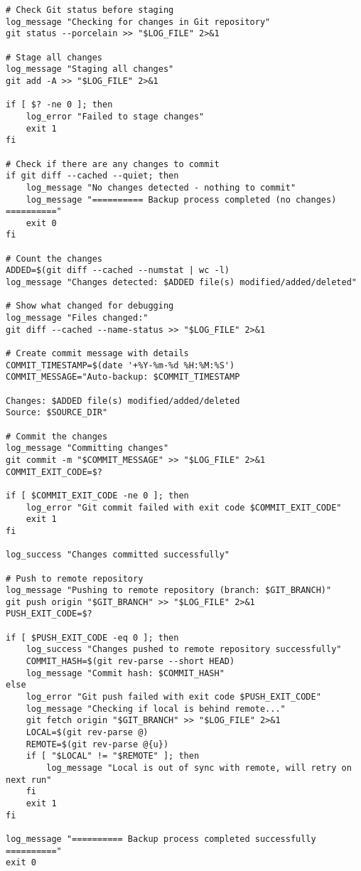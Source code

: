 \begin{verbatim}
# Check Git status before staging
log_message "Checking for changes in Git repository"
git status --porcelain >> "$LOG_FILE" 2>&1

# Stage all changes
log_message "Staging all changes"
git add -A >> "$LOG_FILE" 2>&1

if [ $? -ne 0 ]; then
    log_error "Failed to stage changes"
    exit 1
fi

# Check if there are any changes to commit
if git diff --cached --quiet; then
    log_message "No changes detected - nothing to commit"
    log_message "========== Backup process completed (no changes) =========="
    exit 0
fi

# Count the changes
ADDED=$(git diff --cached --numstat | wc -l)
log_message "Changes detected: $ADDED file(s) modified/added/deleted"

# Show what changed for debugging
log_message "Files changed:"
git diff --cached --name-status >> "$LOG_FILE" 2>&1

# Create commit message with details
COMMIT_TIMESTAMP=$(date '+%Y-%m-%d %H:%M:%S')
COMMIT_MESSAGE="Auto-backup: $COMMIT_TIMESTAMP

Changes: $ADDED file(s) modified/added/deleted
Source: $SOURCE_DIR"

# Commit the changes
log_message "Committing changes"
git commit -m "$COMMIT_MESSAGE" >> "$LOG_FILE" 2>&1
COMMIT_EXIT_CODE=$?

if [ $COMMIT_EXIT_CODE -ne 0 ]; then
    log_error "Git commit failed with exit code $COMMIT_EXIT_CODE"
    exit 1
fi

log_success "Changes committed successfully"

# Push to remote repository
log_message "Pushing to remote repository (branch: $GIT_BRANCH)"
git push origin "$GIT_BRANCH" >> "$LOG_FILE" 2>&1
PUSH_EXIT_CODE=$?

if [ $PUSH_EXIT_CODE -eq 0 ]; then
    log_success "Changes pushed to remote repository successfully"
    COMMIT_HASH=$(git rev-parse --short HEAD)
    log_message "Commit hash: $COMMIT_HASH"
else
    log_error "Git push failed with exit code $PUSH_EXIT_CODE"
    log_message "Checking if local is behind remote..."
    git fetch origin "$GIT_BRANCH" >> "$LOG_FILE" 2>&1
    LOCAL=$(git rev-parse @)
    REMOTE=$(git rev-parse @{u})
    if [ "$LOCAL" != "$REMOTE" ]; then
        log_message "Local is out of sync with remote, will retry on next run"
    fi
    exit 1
fi

log_message "========== Backup process completed successfully =========="
exit 0
\end{verbatim}

